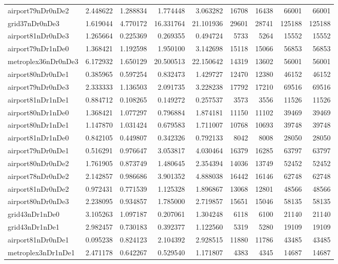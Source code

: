 \begin{longtable}{|l|r|r|r|r|r|r|r|r|}
airport79nDr0nDe2 & 2.448622 & 1.288834 & 1.774448 & 3.063282 & 16708 & 16438 & 66001 & 66001 \\
grid37nDr0nDe3 & 1.619044 & 4.770172 & 16.331764 & 21.101936 & 29601 & 28741 & 125188 & 125188 \\
airport81nDr0nDe3 & 1.265664 & 0.225369 & 0.269355 & 0.494724 & 5733 & 5264 & 15552 & 15552 \\
airport79nDr1nDe0 & 1.368421 & 1.192598 & 1.950100 & 3.142698 & 15118 & 15066 & 56853 & 56853 \\
metroplex36nDr0nDe3 & 6.172932 & 1.650129 & 20.500513 & 22.150642 & 14319 & 13602 & 56001 & 56001 \\
airport80nDr0nDe1 & 0.385965 & 0.597254 & 0.832473 & 1.429727 & 12470 & 12380 & 46152 & 46152 \\
airport79nDr0nDe3 & 2.333333 & 1.136503 & 2.091735 & 3.228238 & 17792 & 17210 & 69516 & 69516 \\
airport81nDr1nDe1 & 0.884712 & 0.108265 & 0.149272 & 0.257537 & 3573 & 3556 & 11526 & 11526 \\
airport80nDr1nDe0 & 1.368421 & 1.077297 & 0.796884 & 1.874181 & 11150 & 11102 & 39469 & 39469 \\
airport80nDr1nDe1 & 1.147870 & 1.031424 & 0.679583 & 1.711007 & 10768 & 10693 & 39748 & 39748 \\
airport81nDr1nDe0 & 0.842105 & 0.449807 & 0.342326 & 0.792133 & 8042 & 8008 & 28050 & 28050 \\
airport79nDr0nDe1 & 0.516291 & 0.976647 & 3.053817 & 4.030464 & 16379 & 16285 & 63797 & 63797 \\
airport80nDr0nDe2 & 1.761905 & 0.873749 & 1.480645 & 2.354394 & 14036 & 13749 & 52452 & 52452 \\
airport78nDr0nDe2 & 2.142857 & 0.986686 & 3.901352 & 4.888038 & 16442 & 16146 & 62748 & 62748 \\
airport81nDr0nDe2 & 0.972431 & 0.771539 & 1.125328 & 1.896867 & 13068 & 12801 & 48566 & 48566 \\
airport80nDr0nDe3 & 2.238095 & 0.934857 & 1.785000 & 2.719857 & 15651 & 15046 & 58135 & 58135 \\
grid43nDr1nDe0 & 3.105263 & 1.097187 & 0.207061 & 1.304248 & 6118 & 6100 & 21140 & 21140 \\
grid43nDr1nDe1 & 2.982457 & 0.730183 & 0.392377 & 1.122560 & 5319 & 5280 & 19109 & 19109 \\
airport81nDr0nDe1 & 0.095238 & 0.824123 & 2.104392 & 2.928515 & 11880 & 11786 & 43485 & 43485 \\
metroplex3nDr1nDe1 & 2.471178 & 0.642267 & 0.529540 & 1.171807 & 4383 & 4345 & 14687 & 14687 \\

\end{longtable}
